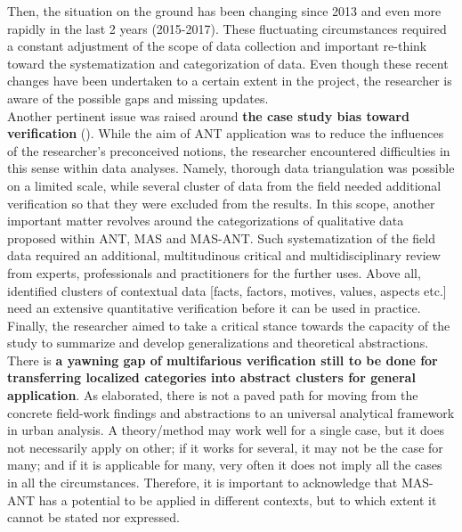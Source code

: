 \documentclass[11pt]{report}
\begin{document}
{{{Then, the situation on the ground has been changing since 2013 and even more rapidly in the last 2 years (2015-2017).
These fluctuating circumstances required a constant adjustment of the scope of data collection and important re-think toward the systematization and categorization of data.
Even though these recent changes have been undertaken to a certain extent in the project, the researcher is aware of the possible gaps and missing updates.
\\

Another pertinent issue was raised around \textbf{the case study bias toward verification} (\href{ref}{\citealt{flyvbjerg_five_2006}}).
While the aim of ANT application was to reduce the influences of the researcher's preconceived notions, the researcher encountered difficulties in this sense within data analyses.
Namely, thorough data triangulation was possible on a limited scale, while several cluster of data from the field needed additional verification so that they were excluded from the results.
In this scope, another important matter revolves around the categorizations of qualitative data proposed within ANT, MAS and MAS-ANT. 
Such systematization of the field data required an additional, multitudinous critical and multidisciplinary review from experts, professionals and practitioners for the further uses.
Above all, identified clusters of contextual data [facts, factors, motives, values, aspects etc.] need an extensive quantitative verification before it can be used in practice.
\\

Finally, the researcher aimed to take a critical stance towards the capacity of the study to summarize and develop generalizations and theoretical abstractions.
There is \textbf{a yawning gap of multifarious verification still to be done for transferring localized categories into abstract clusters for general application}.
As \href{Robinson}{\citealt{robinson_urban_2013}} elaborated, there is not a paved path for moving from the concrete field-work findings and abstractions to an universal analytical framework in urban analysis. A theory/method may work well for a single case, but it does not necessarily apply on other; if it works for several, it may not be the case for many; and if it is applicable for many, very often it does not imply all the cases in all the circumstances.
Therefore, it is important to acknowledge that MAS-ANT has a potential to be applied in different contexts, but to which extent it cannot be stated nor expressed.


}}}
\end{document}
